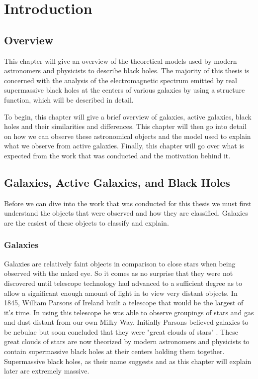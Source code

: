 \documentclass[12pt, oneside]{smuthesis}
\begin{document}
\chapter{\sc Introduction}

\section{\sc Overview}

This chapter will give an overview of the theoretical models used by modern astronomers and physicists to describe black holes. The majority of this thesis is concerned with the analysis of the electromagnetic spectrum emitted by real supermassive black holes at the centers of various galaxies by using a structure function, which will be described in detail.

To begin, this chapter will give a brief overview of galaxies, active galaxies, black holes and their similarities and differences. This chapter will then go into detail on how we can observe these astronomical objects and the model used to explain what we observe from active galaxies. Finally, this chapter will go over what is expected from the work that was conducted and the motivation behind it.

\newpage

\section{\sc Galaxies, Active Galaxies, and Black Holes}

Before we can dive into the work that was conducted for this thesis we must first understand the objects that were observed and how they are classified. Galaxies are the easiest of these objects to classify and explain.

\subsection{\sc Galaxies}

Galaxies are relatively faint objects in comparison to close stars when being observed with the naked eye. So it comes as no surprise that they were not discovered until telescope technology had advanced to a sufficient degree as to allow a significant enough amount of light in to view very distant objects. In 1845, William Parsons of Ireland built a telescope that would be the largest of it's time. In using this telescope he was able to observe groupings of stars and gas and dust distant from our own Milky Way. Initially Parsons believed galaxies to be nebulae but soon concluded that they were "great clouds of stars" \cite{sag}. These great clouds of stars are now theorized by modern astronomers and physicists to contain supermassive black holes at their centers holding them together. Supermassive black holes, as their name suggests and as this chapter will explain later are extremely massive.
\end{document}
